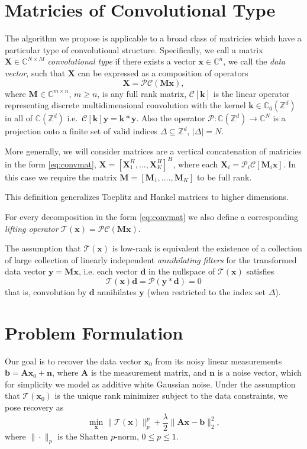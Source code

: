 \documentclass[10pt, twocolumn, twoside]{IEEEtran}
\newcommand{\mbf}{\mathbf}
\begin{document}
\section{Matricies of Convolutional Type}
The algorithm we propose is applicable to a broad class of matricies which have a particular type of convolutional structure. Specifically, we call a matrix $\mbf X\in \mathbb{C}^{N\times M}$ \emph{convolutional type} if there exists a vector $\mbf x \in \mathbb{C}^n$, we call the \emph{data vector}, such that $\mbf X$ can be expressed as a composition of operators
\begin{equation}
\mbf X = \mathcal{P}\mathcal{C}(\mbf M \mbf x),
\label{eq:convmat}
\end{equation}
where $\mbf M \in \mathbb{C}^{m \times n}$, $m \geq n$, is any full rank matrix, $\mathcal{C}[\mbf k]$ is the linear operator representing discrete multidimensional convolution with the kernel $\mbf k \in \mathbb{C}_0(\mathbb{Z}^d)$ in all of $\mathbb{C}(\mathbb{Z}^d)$ i.e.\ $\mathcal{C}[\mbf k]\mbf y = \mbf k \ast \mbf y$. Also the operator $\mathcal{P}:\mathbb{C}(\mathbb{Z}^d)\rightarrow\mathbb{C}^N$ is a projection onto a finite set of valid indices $\Delta \subseteq \mathbb{Z}^d$, $|\Delta| = N$.

More generally, we will consider matrices are a vertical concatenation of matricies in the form \eqref{eq:convmat}, $\mbf X = [\mbf X_1^H,...,\mbf X_K^H]^H$, where each $\mbf X_i = \mathcal{P}_i\mathcal{C}[\mbf M_i \mbf x]$. In this case we require the matrix $\mbf M = [\mbf M_1,....,\mbf M_K]$ to be full rank.

This definition generalizes Toeplitz and Hankel matrices to higher dimensions.

For every decomposition in the form \eqref{eq:convmat} we also define a corresponding \emph{lifting operator} $\mathcal{T}(\mbf x) = \mathcal{P}\mathcal{C}(\mbf M \mbf x)$.

The assumption that $\mathcal{T}(\mbf x)$ is low-rank is equivalent the existence of a collection of large collection of linearly independent \emph{annihilating filters} for the transformed data vector $\mbf y = \mbf M \mbf x$, i.e. each vector $\mbf d$ in the nullspace of $\mathcal{T}(\mbf x)$ satisfies
\[
\mathcal{T}(\mbf x)\mbf d = \mathcal{P}(\mbf y \ast \mbf d) = 0
\]
that is, convolution by $\mbf d$ annihilates $\mbf y$ (when restricted to the index set $\Delta$).
\section{Problem Formulation}
Our goal is to recover the data vector $\mbf x_0$ from its noisy linear measurements $\mathbf b = \mbf A \mbf x_0 + \mbf n$, where $\mbf A$ is the measurement matrix, and $\mbf n$ is a noise vector, which for simplicity we model as additive white Gaussian noise. Under the assumption that $\mathcal{T}(\mbf x_0)$ is the unique rank minimizer subject to the data constraints, we pose recovery as
\begin{equation}
\label{eq:nucnorm}
\min_{\mbf x} \|\mathcal{T}(\mbf x)\|_p^p + \frac{\lambda}{2} \|\mbf A \mbf x - \mbf b\|^2_2,
\end{equation}
where $\|\cdot\|_p$ is the Shatten $p$-norm, $0 \leq p \leq 1$.
\end{document}
